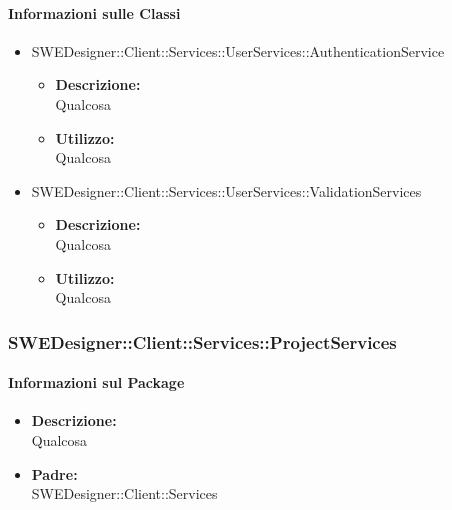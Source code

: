 		\paragraph{Informazioni sulle Classi}
		\begin{itemize}
			\item SWEDesigner::Client::Services::UserServices::AuthenticationService
			\begin{itemize}
				\item \textbf{Descrizione: }\\
				Qualcosa
				\item \textbf{Utilizzo: }\\
				Qualcosa
			\end{itemize}
			\item SWEDesigner::Client::Services::UserServices::ValidationServices
			\begin{itemize}
				\item \textbf{Descrizione: }\\
				Qualcosa
				\item \textbf{Utilizzo: }\\
				Qualcosa
			\end{itemize}
		\end{itemize}


		\subsubsection{SWEDesigner::Client::Services::ProjectServices}
		\paragraph{Informazioni sul Package}
		\begin{itemize}
			\item \textbf{Descrizione: }\\
			Qualcosa
			\item \textbf{Padre: }\\ SWEDesigner::Client::Services
		\end{itemize}

